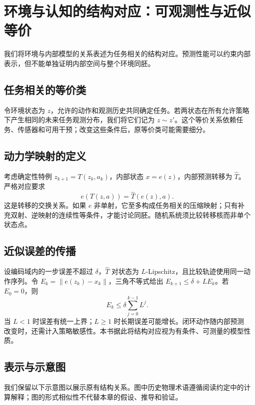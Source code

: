 \chapter{环境与认知的结构对应：可观测性与近似等价}
\label{chp:holomorphic_isomorphism}
\label{sec:brain_cosmos}
\label{sec:holomorphic_theorem}
\label{sec:comprehensibility}
\label{sec:godel_gap}

我们将环境与内部模型的关系表述为任务相关的结构对应。预测性能可以约束内部表示，但不能单独证明内部空间与整个环境同胚。
\section{任务相关的等价类}
令环境状态为 $z$，允许的动作和观测历史共同确定任务。若两状态在所有允许策略下产生相同的未来任务观测分布，我们将它们记为 $z\sim z'$。这个等价关系依赖任务、传感器和可用干预；改变这些条件后，原等价类可能需要细分。
\section{动力学映射的定义}
考虑确定性特例 $z_{k+1}=T(z_k,a_k)$，内部状态 $x=e(z)$，内部预测转移为 $\widehat T$。严格对应要求
\begin{equation}e(T(z,a))=\widehat T(e(z),a).\end{equation}
这是转移的交换关系。如果 $e$ 非单射，它至多构成任务相关的压缩映射；只有补充双射、逆映射的连续性等条件，才能讨论同胚。随机系统须比较转移核而非单个状态点。
\section{近似误差的传播}
设编码域内的一步误差不超过 $\delta$，$\widehat T$ 对状态为 $L$-Lipschitz，且比较轨迹使用同一动作序列。令 $E_k=\|e(z_k)-x_k\|$，三角不等式给出 $E_{k+1}\le\delta+LE_k$。若 $E_0=0$，则
\begin{equation}E_k\le\delta\sum_{j=0}^{k-1}L^j.\end{equation}
当 $L<1$ 时误差有统一上界；$L\ge1$ 时长期误差可能增长。闭环动作随内部预测改变时，还需计入策略敏感性。本书据此将结构对应视为有条件、可测量的模型性质。

\section{表示与示意图}
我们保留以下示意图以展示原有结构关系。图中历史物理术语遵循阅读约定中的计算解释；图的形式相似性不代替本章的假设、推导和验证。

